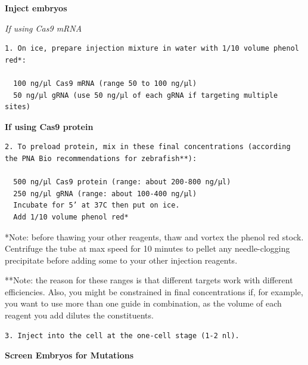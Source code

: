 \documentclass[
  letterpaper,
  DIV=11,
  numbers=noendperiod]{scrreprt}
\begin{document}
\textbf{Inject embryos}

\emph{If using Cas9 mRNA}

\begin{verbatim}
1. On ice, prepare injection mixture in water with 1/10 volume phenol red*: 
  
  100 ng/µl Cas9 mRNA (range 50 to 100 ng/µl) 
  50 ng/µl gRNA (use 50 ng/µl of each gRNA if targeting multiple sites) 
\end{verbatim}

\textbf{If using Cas9 protein}

\begin{verbatim}
2. To preload protein, mix in these final concentrations (according the PNA Bio recommendations for zebrafish**): 
  
  500 ng/µl Cas9 protein (range: about 200-800 ng/µl) 
  250 ng/µl gRNA (range: about 100-400 ng/µl) 
  Incubate for 5’ at 37C then put on ice. 
  Add 1/10 volume phenol red* 
\end{verbatim}

\begin{tcolorbox}[enhanced jigsaw, rightrule=.15mm, title=\textcolor{quarto-callout-note-color}{\faInfo}\hspace{0.5em}{Notes}, titlerule=0mm, opacitybacktitle=0.6, toprule=.15mm, bottomrule=.15mm, opacityback=0, left=2mm, colframe=quarto-callout-note-color-frame, breakable, coltitle=black, colback=white, colbacktitle=quarto-callout-note-color!10!white, bottomtitle=1mm, leftrule=.75mm, toptitle=1mm, arc=.35mm]

*Note: before thawing your other reagents, thaw and vortex the phenol
red stock. Centrifuge the tube at max speed for 10 minutes to pellet any
needle-clogging precipitate before adding some to your other injection
reagents.

**Note: the reason for these ranges is that different targets work with
different efficiencies. Also, you might be constrained in final
concentrations if, for example, you want to use more than one guide in
combination, as the volume of each reagent you add dilutes the
constituents.

\end{tcolorbox}

\begin{verbatim}
3. Inject into the cell at the one-cell stage (1-2 nl). 
\end{verbatim}

\textbf{Screen Embryos for Mutations}
\end{document}
